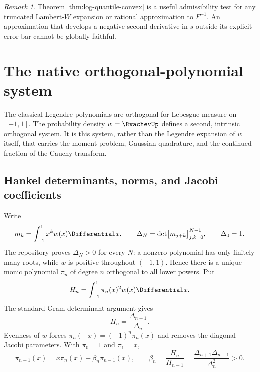 \documentclass[11pt,oneside]{article}
\theoremstyle{definition}
\theoremstyle{remark}
\newtheorem{remark}[theorem]{Remark}
\numberwithin{equation}{section}
\begin{document}
\begin{remark}
Theorem \ref{thm:log-quantile-convex} is a useful admissibility test for any
truncated Lambert-$W$ expansion or rational approximation to $F^{-1}$.  An
approximation that develops a negative second derivative in $s$ outside its
explicit error bar cannot be globally faithful.
\end{remark}

\section{The native orthogonal-polynomial system}
\label{sec:native-op}

The classical Legendre polynomials are orthogonal for Lebesgue measure on
$[-1,1]$.  The probability density $w=\RvachevUp$ defines a second, intrinsic
orthogonal system.  It is this system, rather than the Legendre expansion of
$w$ itself, that carries the moment problem, Gaussian quadrature, and the
continued fraction of the Cauchy transform.

\subsection{Hankel determinants, norms, and Jacobi coefficients}
Write
\begin{equation}
 m_k=\int_{-1}^{1}x^k w(x)\Differential x,
 \qquad
 \Delta_N=\det\bigl[m_{j+k}\bigr]_{j,k=0}^{N-1},
 \qquad \Delta_0=1.
 \label{eq:moment-hankel}
\end{equation}
The repository proves $\Delta_N>0$ for every $N$: a nonzero polynomial has
only finitely many roots, while $w$ is positive throughout $(-1,1)$.  Hence
there is a unique monic polynomial $\pi_n$ of degree $n$ orthogonal to all
lower powers.  Put
\begin{equation}
 H_n=\int_{-1}^{1}\pi_n(x)^2w(x)\Differential x.
 \label{eq:monic-norm}
\end{equation}
The standard Gram-determinant argument gives
\begin{equation}
 H_n=\frac{\Delta_{n+1}}{\Delta_n}.
 \label{eq:norm-hankel-ratio}
\end{equation}
Evenness of $w$ forces $\pi_n(-x)=(-1)^n\pi_n(x)$ and removes the diagonal
Jacobi parameters.  With $\pi_0=1$ and $\pi_1=x$,
\begin{equation}
 \boxed{\pi_{n+1}(x)=x\pi_n(x)-\beta_n\pi_{n-1}(x)},
 \qquad
 \beta_n=\frac{H_n}{H_{n-1}}
 =\frac{\Delta_{n+1}\Delta_{n-1}}{\Delta_n^2}>0.
 \label{eq:monic-recurrence}
\end{equation}
\end{document}
